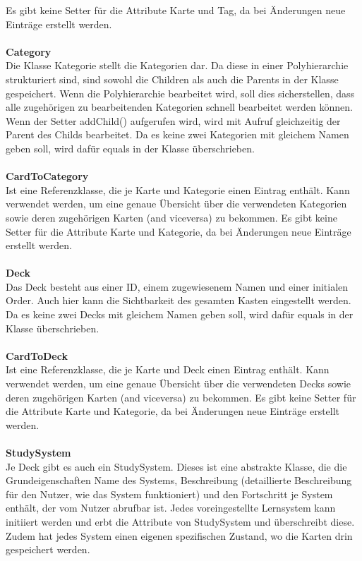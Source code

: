 \documentclass[fontsize=12pt,paper=a4,twoside]{scrartcl}
\begin{document}
Es gibt keine Setter für die Attribute Karte und Tag, da bei Änderungen neue Einträge erstellt werden.
\\
\\
\textbf{Category}\\
Die Klasse Kategorie stellt die Kategorien dar. Da diese in einer Polyhierarchie strukturiert sind, sind sowohl die Children als auch die Parents in der Klasse gespeichert. Wenn die Polyhierarchie bearbeitet wird, soll dies sicherstellen, dass alle zugehörigen zu bearbeitenden Kategorien schnell bearbeitet werden können. Wenn der Setter addChild() aufgerufen wird, wird mit Aufruf gleichzeitig der Parent des Childs bearbeitet.
Da es keine zwei Kategorien mit gleichem Namen geben soll, wird dafür equals in der Klasse überschrieben.
\\
\\
\textbf{CardToCategory}\\
Ist eine Referenzklasse, die je Karte und Kategorie einen Eintrag enthält. Kann verwendet werden, um eine genaue Übersicht über die verwendeten Kategorien sowie deren zugehörigen Karten (and viceversa) zu bekommen.
Es gibt keine Setter für die Attribute Karte und Kategorie, da bei Änderungen neue Einträge erstellt werden.
\\
\\
\textbf{Deck}\\
Das Deck besteht aus einer ID, einem zugewiesenem Namen und einer initialen Order. Auch hier kann die Sichtbarkeit des gesamten Kasten eingestellt werden. Da es keine zwei Decks mit gleichem Namen geben soll, wird dafür equals in der Klasse überschrieben.
\\
\\
\textbf{CardToDeck}\\
Ist eine Referenzklasse, die je Karte und Deck einen Eintrag enthält.
Kann verwendet werden, um eine genaue Übersicht über die verwendeten Decks sowie deren zugehörigen Karten (and viceversa) zu bekommen.
Es gibt keine Setter für die Attribute Karte und Kategorie, da bei Änderungen neue Einträge erstellt werden.
\\
\\
\textbf{StudySystem}\\ 
Je Deck gibt es auch ein StudySystem. Dieses ist eine abstrakte Klasse, 
die die Grundeigenschaften Name des Systems, Beschreibung (detaillierte Beschreibung für den Nutzer, wie das System funktioniert) und den Fortschritt je System enthält, der vom Nutzer abrufbar ist. Jedes voreingestellte Lernsystem kann initiiert werden und erbt die Attribute von StudySystem und überschreibt diese. Zudem hat jedes System einen eigenen spezifischen Zustand, wo die Karten drin gespeichert werden. 
\end{document}
